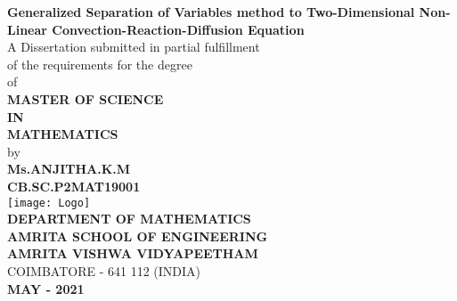 \documentclass[a4paper,12pt]{article}
\numberwithin{equation}{section}
\begin{document}
\begin{titlepage}
\begin{center}
\vspace*{1cm}
{\bf{Generalized Separation of Variables method to Two-Dimensional Non-Linear Convection-Reaction-Diffusion Equation}}\\
\vspace{1.5cm}
{\large{A Dissertation submitted in partial  fulfillment\\
of the requirements for the degree\\
 of\\}}
{\bf{MASTER OF SCIENCE\\
IN\\
MATHEMATICS}}\\
by\\
{\bf{Ms.ANJITHA.K.M\\
CB.SC.P2MAT19001}}\\
\vspace{0.5cm}
\texttt{[image: Logo]}\\
\vspace{0.5cm}
{\normalsize{\bf{{DEPARTMENT OF MATHEMATICS}}}}\\
\vspace{0.2cm}
{\large{\bf{{AMRITA SCHOOL OF ENGINEERING}}}}\\
\vspace{0.2cm}
{\Large{\bf{{AMRITA VISHWA VIDYAPEETHAM}}}}\\
\vspace{0.2cm}
COIMBATORE - 641 112 (INDIA)\\
{\bf{MAY - 2021}}
\end{center}
\end{titlepage}
\end{document}
